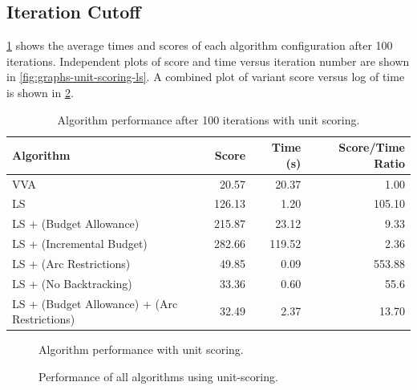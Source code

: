 \documentclass[honors]{union-cs-thesis}
\begin{document}
\subsection{Iteration Cutoff}
\label{sec:iteration-cutoff}
\cref{tab:unit-scoring-results} shows the average times and scores of each algorithm configuration after 100 iterations. Independent plots of score and time versus iteration number are shown in \cref{fig:graphs-unit-scoring-ls}. A combined plot of variant score versus log of time is shown in \cref{fig:graphs-combined-unit-scoring}.

\label{sec:unit-scoring}
\begin{table}
\begin{center}
\begin{tabular}{|l|r|r|r|}
    \hline
    \textbf{Algorithm} & \textbf{Score} & \textbf{Time (s)} & \textbf{Score/Time Ratio} \\
    \hline
    VVA & 20.57 & 20.37 & 1.00 \\
    \hline
    LS & 126.13 & 1.20 & 105.10 \\
    \hline
    LS + (Budget Allowance) & 215.87 & 23.12 & 9.33 \\
    \hline
    LS + (Incremental Budget) & 282.66 & 119.52 & 2.36 \\
    \hline
    LS + (Arc Restrictions) & 49.85 & 0.09 & 553.88 \\
    \hline
    LS + (No Backtracking) & 33.36 & 0.60 & 55.6 \\
    \hline
    LS + (Budget Allowance) + (Arc Restrictions) & 32.49 & 2.37 & 13.70  \\
    \hline
\end{tabular}
\caption{Algorithm performance after 100 iterations with unit scoring.}
\label{tab:unit-scoring-results}
\end{center}
\end{table}

\begin{figure}

\caption[Individual algorithm performance graphs]{Algorithm performance with unit scoring.}
\label{fig:graphs-unit-scoring}
\end{figure}


\begin{figure}

\caption[Combined algorithm performance graph]{Performance of all algorithms using unit-scoring.}
\label{fig:graphs-combined-unit-scoring}
\end{figure}
\end{document}
